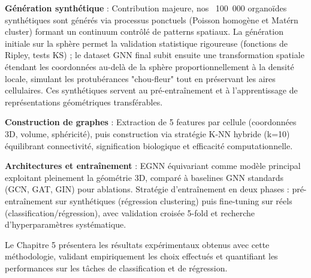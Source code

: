 \textbf{Génération synthétique} : Contribution majeure, nos ~100~000 organoïdes synthétiques sont générés via processus ponctuels (Poisson homogène et Matérn cluster) formant un continuum contrôlé de patterns spatiaux. La génération initiale sur la sphère permet la validation statistique rigoureuse (fonctions de Ripley, tests KS) ; le dataset GNN final subit ensuite une transformation spatiale étendant les coordonnées au-delà de la sphère proportionnellement à la densité locale, simulant les protubérances "chou-fleur" tout en préservant les aires cellulaires. Ces synthétiques servent au pré-entraînement et à l'apprentissage de représentations géométriques transférables.

\textbf{Construction de graphes} : Extraction de 5 features par cellule (coordonnées 3D, volume, sphéricité), puis construction via stratégie K-NN hybride (k=10) équilibrant connectivité, signification biologique et efficacité computationnelle.

\textbf{Architectures et entraînement} : EGNN équivariant comme modèle principal exploitant pleinement la géométrie 3D, comparé à baselines GNN standards (GCN, GAT, GIN) pour ablations. Stratégie d'entraînement en deux phases : pré-entraînement sur synthétiques (régression clustering) puis fine-tuning sur réels (classification/régression), avec validation croisée 5-fold et recherche d'hyperparamètres systématique.

Le Chapitre 5 présentera les résultats expérimentaux obtenus avec cette méthodologie, validant empiriquement les choix effectués et quantifiant les performances sur les tâches de classification et de régression.
